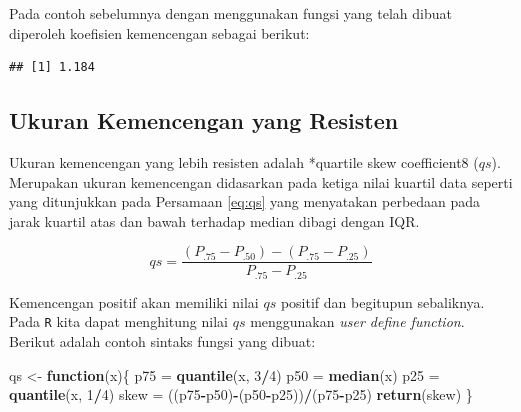 \documentclass[]{book}
\newenvironment{Shaded}{\begin{snugshade}}{\end{snugshade}}
\newcommand{\KeywordTok}[1]{\textcolor[rgb]{0.13,0.29,0.53}{\textbf{#1}}}
\newcommand{\DecValTok}[1]{\textcolor[rgb]{0.00,0.00,0.81}{#1}}
\newcommand{\StringTok}[1]{\textcolor[rgb]{0.31,0.60,0.02}{#1}}
\newcommand{\ControlFlowTok}[1]{\textcolor[rgb]{0.13,0.29,0.53}{\textbf{#1}}}
\newcommand{\OperatorTok}[1]{\textcolor[rgb]{0.81,0.36,0.00}{\textbf{#1}}}
\newcommand{\NormalTok}[1]{#1}
\begin{document}
Pada contoh sebelumnya dengan menggunakan fungsi yang telah dibuat
diperoleh koefisien kemencengan sebagai berikut:

\begin{Shaded}
\end{Shaded}

\begin{verbatim}
## [1] 1.184
\end{verbatim}

\subsection{Ukuran Kemencengan yang
Resisten}\label{ukuran-kemencengan-yang-resisten}

Ukuran kemencengan yang lebih resisten adalah *quartile skew
coefficient8 (\(qs\)). Merupakan ukuran kemencengan didasarkan pada
ketiga nilai kuartil data seperti yang ditunjukkan pada Persamaan
\eqref{eq:qs} yang menyatakan perbedaan pada jarak kuartil atas dan bawah
terhadap median dibagi dengan IQR.

\begin{equation}
  qs=\frac{\left(P_{.75}-P_{.50}\right)-\left(P_{.75}-P_{.25}\right)}{P_{.75}-P_{.25}}
  \label{eq:qs}
\end{equation}

Kemencengan positif akan memiliki nilai \(qs\) positif dan begitupun
sebaliknya. Pada \texttt{R} kita dapat menghitung nilai \(qs\)
menggunakan \emph{user define function}. Berikut adalah contoh sintaks
fungsi yang dibuat:

\begin{Shaded}
\begin{Highlighting}[]
\NormalTok{qs <-}\StringTok{ }\ControlFlowTok{function}\NormalTok{(x)\{}
\NormalTok{  p75 =}\StringTok{ }\KeywordTok{quantile}\NormalTok{(x, }\DecValTok{3}\OperatorTok{/}\DecValTok{4}\NormalTok{)}
\NormalTok{  p50 =}\StringTok{ }\KeywordTok{median}\NormalTok{(x)}
\NormalTok{  p25 =}\StringTok{ }\KeywordTok{quantile}\NormalTok{(x, }\DecValTok{1}\OperatorTok{/}\DecValTok{4}\NormalTok{)}
\NormalTok{  skew =}\StringTok{ }\NormalTok{((p75}\OperatorTok{-}\NormalTok{p50)}\OperatorTok{-}\NormalTok{(p50}\OperatorTok{-}\NormalTok{p25))}\OperatorTok{/}\NormalTok{(p75}\OperatorTok{-}\NormalTok{p25)}
  \KeywordTok{return}\NormalTok{(skew)}
\NormalTok{\}}
\end{Highlighting}
\end{Shaded}
\end{document}
